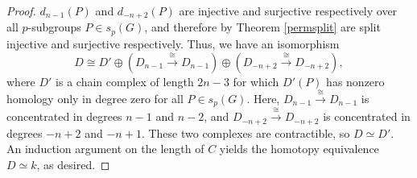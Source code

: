 \documentclass[10pt,a4paper]{amsart}
\begin{document}
\begin{proof}
		$d_{n-1}(P)$ and $d_{-n + 2}(P)$ are injective and surjective respectively over all $p$-subgroups $P\in s_p(G)$, and therefore by Theorem \ref{permsplit} are split injective and surjective respectively. Thus, we have an isomorphism \[D \cong D' \oplus (D_{n-1} \xrightarrow{\cong} D_{n-1}) \oplus (D_{-n + 2} \xrightarrow{\cong} D_{-n + 2}),\] where $D'$ is a chain complex of length $2n - 3$ for which $D'(P)$ has nonzero homology only in degree zero for all $P \in s_p(G)$. Here, $D_{n-1} \xrightarrow{\cong} D_{n-1}$ is concentrated in degrees $n-1$ and $n-2$, and $D_{-n + 2} \xrightarrow{\cong} D_{-n + 2}$ is concentrated in degrees $-n+2$ and $-n+1$. These two complexes are contractible, so $D \simeq D'$. An induction argument on the length of $C$ yields the homotopy equivalence $D \simeq k$, as desired.
	\end{proof}
\end{document}
